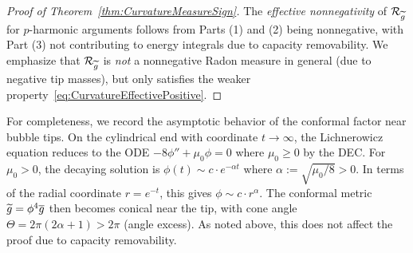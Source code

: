 \begin{proof}[Proof of Theorem~\ref{thm:CurvatureMeasureSign}]
The \emph{effective nonnegativity} of $\mathcal{R}_{\widetilde{g}}$ for $p$-harmonic arguments follows from Parts (1) and (2) being nonnegative, with Part (3) not contributing to energy integrals due to capacity removability. We emphasize that $\mathcal{R}_{\widetilde{g}}$ is \emph{not} a nonnegative Radon measure in general (due to negative tip masses), but only satisfies the weaker property~\eqref{eq:CurvatureEffectivePositive}.
\end{proof}

\begin{remark}\label{rem:BubbleTipAsymptotics}
For completeness, we record the asymptotic behavior of the conformal factor near bubble tips. On the cylindrical end with coordinate $t \to \infty$, the Lichnerowicz equation reduces to the ODE $-8\phi'' + \mu_0 \phi = 0$ where $\mu_0 \ge 0$ by the DEC. For $\mu_0 > 0$, the decaying solution is $\phi(t) \sim c \cdot e^{-\alpha t}$ where $\alpha := \sqrt{\mu_0/8} > 0$. In terms of the radial coordinate $r = e^{-t}$, this gives $\phi \sim c \cdot r^\alpha$. The conformal metric $\widetilde{g} = \phi^4 \overline{g}$ then becomes conical near the tip, with cone angle $\Theta = 2\pi(2\alpha + 1) > 2\pi$ (angle excess). As noted above, this does not affect the proof due to capacity removability.
\end{remark}

